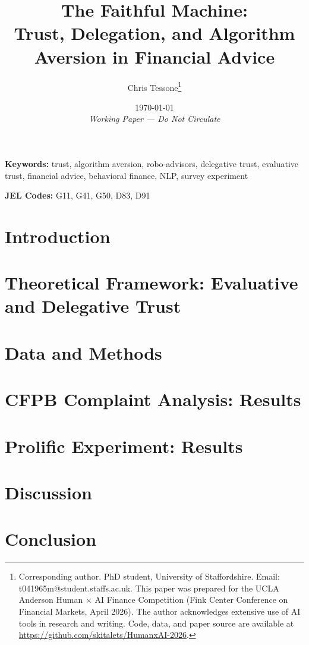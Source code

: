 \documentclass[letterpaper]{article}
\title{The Faithful Machine: \\
       Trust, Delegation, and Algorithm \\
       Aversion in Financial Advice}
\author{Chris Tessone\thanks{Corresponding author. PhD student, University of Staffordshire. Email: t041965m@student.staffs.ac.uk.
This paper was prepared for the UCLA Anderson Human $\times$ AI Finance Competition
(Fink Center Conference on Financial Markets, April 2026).
The author acknowledges extensive use of AI tools in research and writing.
Code, data, and paper source are available at \url{https://github.com/skitalets/HumanxAI-2026}.}}
\date{\today \\ \small \textit{Working Paper --- Do Not Circulate}}
\begin{document}
\maketitle

\begin{abstract}

\end{abstract}

\noindent\textbf{Keywords:} trust, algorithm aversion, robo-advisors, delegative trust,
evaluative trust, financial advice, behavioral finance, NLP, survey experiment

\noindent\textbf{JEL Codes:} G11, G41, G50, D83, D91

\clearpage
\tableofcontents
\clearpage


\section{Introduction}
\label{sec:introduction}


\section{Theoretical Framework: Evaluative and Delegative Trust}
\label{sec:theory}


\section{Data and Methods}
\label{sec:data_methods}


\section{CFPB Complaint Analysis: Results}
\label{sec:results_cfpb}


\section{Prolific Experiment: Results}
\label{sec:results_prolific}


\section{Discussion}
\label{sec:discussion}


\section{Conclusion}
\label{sec:conclusion}

\end{document}
